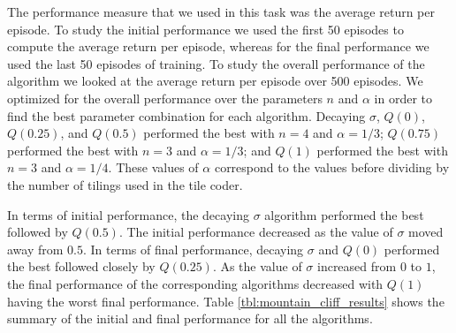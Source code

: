 The performance measure that we used in this task was the average return per episode.
To study the initial performance we used the first 50 episodes to compute the average return per episode, whereas for the final performance we used the last 50 episodes of training.
To study the overall performance of the algorithm we looked at the average return per episode over 500 episodes.
We optimized for the overall performance over the parameters $n$ and $\alpha$ in order to find the best parameter combination for each algorithm.
Decaying $\sigma$, $Q(0)$, $Q(0.25)$, and $Q(0.5)$ performed the best with $n = 4$ and $\alpha = 1/3$; $Q(0.75)$ performed the best with $n = 3$ and $\alpha = 1/3$; and $Q(1)$ performed the best with $n = 3$ and $\alpha = 1/4$. 
These values of $\alpha$ correspond to the values before dividing by the number of tilings used in the tile coder.

In terms of initial performance, the decaying $\sigma$ algorithm performed the best followed by $Q(0.5)$.
The initial performance decreased as the value of $\sigma$ moved away from $0.5$.
In terms of final performance, decaying $\sigma$ and $Q(0)$ performed the best followed closely by $Q(0.25)$.
As the value of $\sigma$ increased from $0$ to $1$, the final performance of the corresponding algorithms decreased with $Q(1)$ having the worst final performance.
Table \ref{tbl:mountain_cliff_results} shows the summary of the initial and final performance for all the algorithms.

